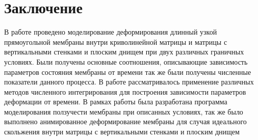 \chapter*{Заключение}
В работе проведено моделирование деформирования длинный узкой прямоугольной мембраны 
внутри криволинейной матрицы и матрицы с вертикальными стенками и плоским днищем при двух различных граничных условиях.
Были получены основные соотношения, описывающие зависимость параметров состояния мембраны от времени так
же были получены численные показатели данного процесса.
В работе рассматривалось применение различных методов численного интегрирования для построения зависимости параметров деформации от времени.
В рамках работы была разработана программа моделирования ползучести мембраны при описанных условиях, так же было выполнено анимированное 
деформирование мембраны для случая идеального скольжения внутри матрицы с вертикальными стенками и плоским днищем